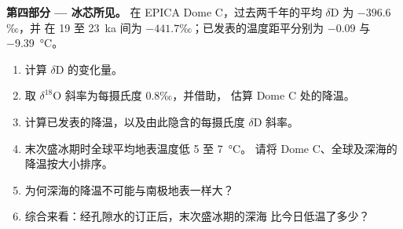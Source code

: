 \begin{problem}
\medskip\noindent\textbf{第四部分 --- 冰芯所见。}
在 EPICA Dome C，过去两千年的平均 $\delta$D 为 $-396.6$‰，并
在 19 至 \qty{23}{ka} 间为 $-441.7$‰；已发表的温度距平分别为 $-0.09$ 与
\qty{-9.39}{\celsius}。
\begin{enumerate}[resume]
  \item 计算 $\delta$D 的变化量。
  \item 取 $\delta^{18}$O 斜率为每摄氏度 \num{0.8}‰，并借助，
        估算 Dome C 处的降温。
  \item 计算已发表的降温，以及由此隐含的每摄氏度 $\delta$D 斜率。
  \item 末次盛冰期时全球平均地表温度低 5 至 \qty{7}{\celsius}。
        请将 Dome C、全球及深海的降温按大小排序。
  \item 为何深海的降温不可能与南极地表一样大？
  \item 综合来看：经孔隙水的订正后，末次盛冰期的深海
        比今日低温了多少？
\end{enumerate}
\end{problem}
